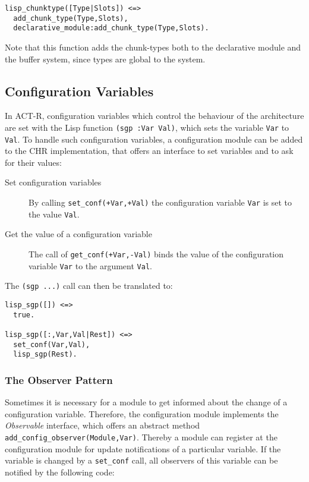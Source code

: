 \begin{lstlisting}
lisp_chunktype([Type|Slots]) <=>
  add_chunk_type(Type,Slots),
  declarative_module:add_chunk_type(Type,Slots).
\end{lstlisting}

Note that this function adds the chunk-types both to the declarative module and the buffer system, since types are global to the system.

\subsection{Configuration Variables}
\label{configuration}

In ACT-R, configuration variables which control the behaviour of the architecture are set with the Lisp function \lstinline|(sgp :Var Val)|, which sets the variable \lstinline|Var| to \lstinline|Val|. To handle such configuration variables, a configuration module can be added to the CHR implementation, that offers an interface to set variables and to ask for their values:

\begin{description}
 \item[Set configuration variables] By calling \lstinline|set_conf(+Var,+Val)| the configuration variable \lstinline|Var| is set to the value \lstinline|Val|.
 \item[Get the value of a configuration variable] The call of \lstinline|get_conf(+Var,-Val)| binds the value of the configuration variable \lstinline|Var| to the argument \lstinline|Val|.
\end{description}

The \lstinline|(sgp ...)| call can then be translated to:

\begin{lstlisting}
lisp_sgp([]) <=>
  true.

lisp_sgp([:,Var,Val|Rest]) <=>
  set_conf(Var,Val),
  lisp_sgp(Rest).
\end{lstlisting}

\subsubsection{The Observer Pattern}

Sometimes it is necessary for a module to get informed about the change of a configuration variable. Therefore, the configuration module implements the \emph{Observable} interface, which offers an abstract method \lstinline|add_config_observer(Module,Var)|. Thereby a module can register at the configuration module for update notifications of a particular variable. If the variable is changed by a \lstinline|set_conf| call, all observers of this variable can be notified by the following code:

